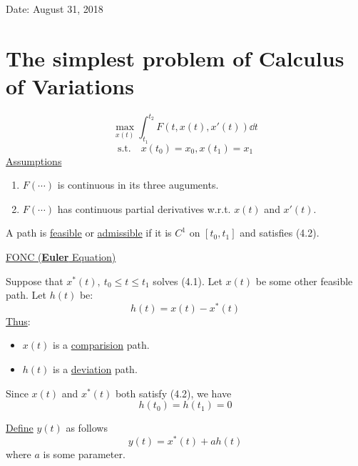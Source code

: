 \documentclass[twoside]{article}
\begin{document}

\hfill Date: August 31, 2018

\section{The simplest problem of Calculus of Variations}
\begin{equation}
    \max_{x(t)} \int_{t_1}^{t_2} F(t,x(t),x'(t)) \dd t
\end{equation}
\begin{equation}
    \text{s.t.} \quad x(t_0) = x_0, x(t_1) = x_1
\end{equation}
\underline{Assumptions}
\begin{enumerate}
    \item $F(\cdots)$ is continuous in its three auguments.
    \item $F(\cdots)$ has continuous partial derivatives w.r.t. $x(t)$ and $x'(t) $.
\end{enumerate}

\begin{definition}
    A path is \underline{feasible} or \underline{admissible} if it is $C^1$ on $[t_0, t_1]$ and satisfies (4.2).
\end{definition}

\underline{FONC ({\bf Euler} Equation)}

Suppose that $x^*(t), ~t_0 \leq t \leq t_1$ solves (4.1). Let $x(t)$ be some other feasible path. Let $h(t)$ be:
\begin{equation}
     h(t) = x(t) - x^*(t)
\end{equation} 
\underline{Thus}:
\begin{itemize}
    \item $x(t)$ is a \underline{comparision} path.\\
    \item $h(t)$ is a \underline{deviation} path.
\end{itemize}
Since $x(t)$ and $x^{*}(t)$ both satisfy (4.2), we have 
\begin{equation}
    h(t_0) = h(t_1) = 0
\end{equation}

\underline{Define} $y(t)$ as follows
\begin{equation}
    y(t) = x^*(t) + a h(t)
\end{equation}
where $a$ is some parameter.
\end{document}
